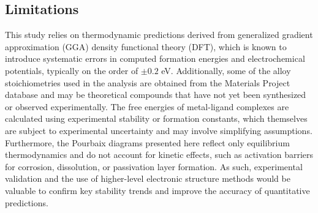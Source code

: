 \documentclass[journal=jacsat,manuscript=article]{achemso}
\begin{document}
\subsection{Limitations}

This study relies on thermodynamic predictions derived from generalized gradient approximation (GGA) density functional theory (DFT), which is known to introduce systematic errors in computed formation energies and electrochemical potentials, typically on the order of $\pm 0.2$ eV. Additionally, some of the alloy stoichiometries used in the analysis are obtained from the Materials Project database and may be theoretical compounds that have not yet been synthesized or observed experimentally. The free energies of metal-ligand complexes are calculated using experimental stability or formation constants, which themselves are subject to experimental uncertainty and may involve simplifying assumptions. Furthermore, the Pourbaix diagrams presented here reflect only equilibrium thermodynamics and do not account for kinetic effects, such as activation barriers for corrosion, dissolution, or passivation layer formation. As such, experimental validation and the use of higher-level electronic structure methods would be valuable to confirm key stability trends and improve the accuracy of quantitative predictions.





\end{document}
